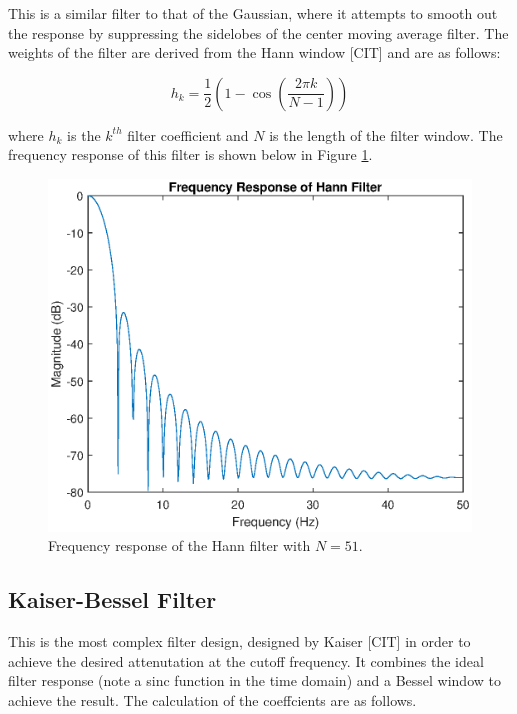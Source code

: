                 This is a similar filter to that of the Gaussian, where it attempts to smooth out the response by suppressing the sidelobes of the center moving average filter. The weights of the filter are derived from the Hann window [CIT] and are as follows: 

                \begin{equation}
                    h_k = \frac{1}{2}(1 - \cos(\frac{2\pi k}{N - 1}))
                \end{equation}

                where $h_k$ is the $k^{th}$ filter coefficient and $N$ is the length of the filter window. The frequency response of this filter is shown below in Figure \ref{img_ha_filter}.

                \begin{figure}[!th]
                    \includegraphics[width=\textwidth]{Images/ha_filter.eps}
                    \centering
                    \caption{Frequency response of the Hann filter with $N=51$.}
                    \label{img_ha_filter}
                \end{figure}  

            \subsection{Kaiser-Bessel Filter}

                This is the most complex filter design, designed by Kaiser [CIT] in order to achieve the desired attenutation at the cutoff frequency. It combines the ideal filter response (note a sinc function in the time domain) and a Bessel window to achieve the result. The calculation of the coeffcients are as follows.

